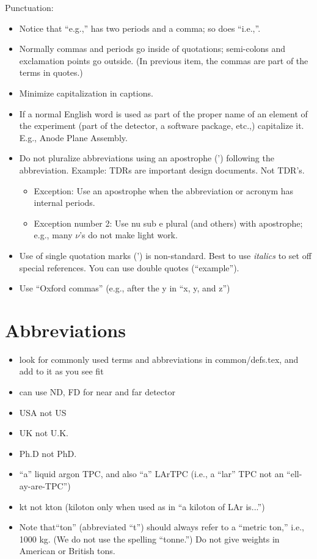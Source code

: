 Punctuation:
\begin{itemize}
\item Notice that ``e.g.,'' has two periods and a comma; so does ``i.e.,''.
\item Normally commas and periods go inside of quotations;  semi-colons and exclamation points go outside.  (In previous item, the commas are part of the terms in quotes.)
\item Minimize capitalization in captions.
\item If a normal English word is used as part of the proper name of an element of the experiment (part of the detector, a software package, etc.,) capitalize it. E.g., Anode Plane Assembly. 
\item Do not pluralize abbreviations using an apostrophe (') following the abbreviation. Example: TDRs are important design documents. Not TDR's. 
\begin{itemize}
\item Exception: Use an apostrophe when the abbreviation or acronym has internal periods. 
\item Exception number \num{2}: Use nu sub e plural (and others) with apostrophe; e.g., many $\nu$'s do not make light work.
\end{itemize}
\item Use of single quotation marks (') is non-standard. Best to use \emph{italics} to set off special references. You can use double quotes (``example''). 
\item Use ``Oxford commas'' (e.g., after the y in ``x, y, and z'') 
\end{itemize}


\section{Abbreviations}
\label{sec:english-abbrevs}

\begin{itemize}
\item look for commonly used terms and abbreviations in common/defs.tex, and add to it as you see fit 
\item can use ND, FD for near and far detector
\item USA not US
\item UK not U.K. 
\item Ph.D not PhD.
\item ``a'' liquid argon TPC, and also ``a'' LArTPC (i.e., a ``lar'' TPC not an ``ell-ay-are-TPC'') 
\item \si{kt} not \si{kton} (kiloton only when used as in ``a kiloton of LAr is...'') 
\item Note that``ton'' (abbreviated ``t'') should always refer to a ``metric ton,'' i.e., 1000 kg. (We do not use the spelling ``tonne.'')  Do not give weights in American or British tons. 

\end{itemize}

